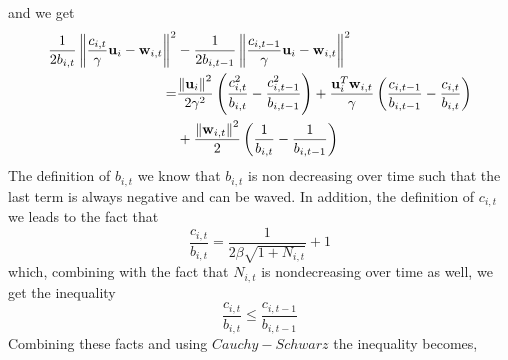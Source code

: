 {and we get
\begin{equation*}
\begin{split}
\frac{1}{2b_{i,t}}\left\Vert {\frac{c_{i,t}}{\gamma} \mathbf{u}_i-\mathbf{w}_{i,t}} \right\Vert^2&-\frac{1}{2b_{i,t-1}}\left\Vert {\frac{c_{i,t-1}}{\gamma} \mathbf{u}_i-\mathbf{w}_{i,t}} \right\Vert^2\\
=&\frac{\left\Vert {\mathbf{u}_i} \right\Vert^2}{2\gamma^2}\left({\frac{c_{i,t}^2}{b_{i,t}}-\frac{c_{i,t-1}^2}{b_{i,t-1}}}\right)+
\frac{\mathbf{u}_i^T\mathbf{w}_{i,t}}{\gamma}\left({\frac{c_{i,t-1}}{b_{i,t-1}}-\frac{c_{i,t}}{b_{i,t}}}\right)\\
&+\frac{\left\Vert {\mathbf{w}_{i,t}} \right\Vert^2}{2}\left({\frac{1}{b_{i,t}}-\frac{1}{b_{i,t-1}}}\right)
\end{split}
\end{equation*}
The definition of $b_{i,t}$ we know that $b_{i,t}$ is non decreasing over time such that the last term is always negative and can be waved. In addition,  the definition of $c_{i,t}$ we leads to the fact that  
\begin{equation*}
\frac{c_{i,t}}{b_{i,t}}=\frac{1}{2\beta\sqrt{1+N_{i,t}}}+1
\end{equation*}
which, combining with the fact that $N_{i,t}$ is nondecreasing over time as well, we get the inequality 
\begin{equation*}
\frac{c_{i,t}}{b_{i,t}}\le\frac{c_{i,t-1}}{b_{i,t-1}}
\end{equation*}
Combining these facts and using $Cauchy-Schwarz$ the inequality becomes,

}
